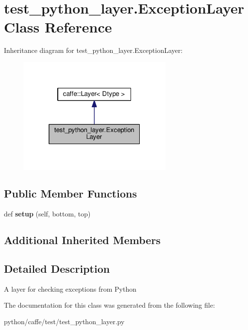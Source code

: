 \hypertarget{classtest__python__layer_1_1_exception_layer}{}\section{test\+\_\+python\+\_\+layer.\+Exception\+Layer Class Reference}
\label{classtest__python__layer_1_1_exception_layer}


Inheritance diagram for test\+\_\+python\+\_\+layer.\+Exception\+Layer\+:
\nopagebreak
\begin{figure}[H]
\begin{center}
\leavevmode
\includegraphics[width=220pt]{classtest__python__layer_1_1_exception_layer__inherit__graph}
\end{center}
\end{figure}
\subsection*{Public Member Functions}
\begin{DoxyCompactItemize}
\item 
\mbox{\label{classtest__python__layer_1_1_exception_layer_a22b5a22f51b62610989386233ed32faf}} 
def {\bfseries setup} (self, bottom, top)
\end{DoxyCompactItemize}
\subsection*{Additional Inherited Members}


\subsection{Detailed Description}
\begin{DoxyVerb}A layer for checking exceptions from Python\end{DoxyVerb}
 

The documentation for this class was generated from the following file\+:\begin{DoxyCompactItemize}
\item 
python/caffe/test/test\+\_\+python\+\_\+layer.\+py\end{DoxyCompactItemize}
